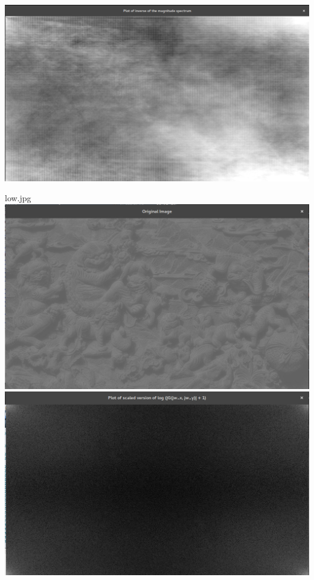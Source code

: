 \documentclass[a4paper,fleqn,11pt]{article}
\theoremstyle{mytheor}
\begin{document}
\begin{center}
\includegraphics[scale= 0.25]{../results/divyat_magnitude.png}
\end{center}
\begin{center}
low.jpg \\
\includegraphics[scale= 0.25]{../results/low.png}
\includegraphics[scale= 0.25]{../results/low_spectrum.png}

\end{center}
\end{document}
